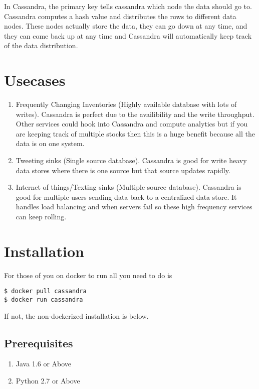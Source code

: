 \documentclass[9pt,twocolumn,twoside]{idsi}
\begin{document}
In Cassandra, the primary key tells cassandra which node the data should go to. Cassandra computes a hash value and distributes the rows to different data nodes. These nodes actually store the data, they can go down at any time, and they can come back up at any time and Cassandra will automatically keep track of the data distribution.

\section{Usecases}

\begin{enumerate}

\item Frequently Changing Inventories (Highly available database with lots of writes). Cassandra is perfect due to the availibility and the write throughput. Other services could hook into Cassandra and compute analytics but if you are keeping track of multiple stocks then this is a huge benefit because all the data is on one system.

\item Tweeting sinks (Single source database). Cassandra is good for write heavy data stores where there is one source but that source updates rapidly.

\item Internet of things/Texting sinks (Multiple source database). Cassandra is good for multiple users sending data back to a centralized data store. It handles load balancing and when servers fail so these high frequency services can keep rolling.

\end{enumerate}

\section{Installation}

For those of you on docker to run all you need to do is

\begin{lstlisting}[breaklines]
$ docker pull cassandra
$ docker run cassandra
\end{lstlisting}

If not, the non-dockerized installation is below.

\subsection{Prerequisites}
\begin{enumerate}
  \item Java 1.6 or Above
  \item Python 2.7 or Above
\end{enumerate}
\end{document}
